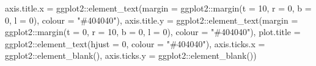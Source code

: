 \documentclass[
]{book}
\newenvironment{Shaded}{\begin{snugshade}}{\end{snugshade}}
\newcommand{\AttributeTok}[1]{\textcolor[rgb]{0.77,0.63,0.00}{#1}}
\newcommand{\DecValTok}[1]{\textcolor[rgb]{0.00,0.00,0.81}{#1}}
\newcommand{\FunctionTok}[1]{\textcolor[rgb]{0.00,0.00,0.00}{#1}}
\newcommand{\NormalTok}[1]{#1}
\newcommand{\SpecialCharTok}[1]{\textcolor[rgb]{0.00,0.00,0.00}{#1}}
\newcommand{\StringTok}[1]{\textcolor[rgb]{0.31,0.60,0.02}{#1}}
\begin{document}
\begin{Shaded}
\begin{Highlighting}[]
               \AttributeTok{axis.title.x =}\NormalTok{ ggplot2}\SpecialCharTok{::}\FunctionTok{element\_text}\NormalTok{(}\AttributeTok{margin =}\NormalTok{ ggplot2}\SpecialCharTok{::}\FunctionTok{margin}\NormalTok{(}\AttributeTok{t =} \DecValTok{10}\NormalTok{, }\AttributeTok{r =} \DecValTok{0}\NormalTok{, }\AttributeTok{b =} \DecValTok{0}\NormalTok{, }\AttributeTok{l =} \DecValTok{0}\NormalTok{), }\AttributeTok{colour =} \StringTok{"\#404040"}\NormalTok{),}
               \AttributeTok{axis.title.y =}\NormalTok{ ggplot2}\SpecialCharTok{::}\FunctionTok{element\_text}\NormalTok{(}\AttributeTok{margin =}\NormalTok{ ggplot2}\SpecialCharTok{::}\FunctionTok{margin}\NormalTok{(}\AttributeTok{t =} \DecValTok{0}\NormalTok{, }\AttributeTok{r =} \DecValTok{10}\NormalTok{, }\AttributeTok{b =} \DecValTok{0}\NormalTok{, }\AttributeTok{l =} \DecValTok{0}\NormalTok{), }\AttributeTok{colour =} \StringTok{"\#404040"}\NormalTok{),}
               \AttributeTok{plot.title =}\NormalTok{ ggplot2}\SpecialCharTok{::}\FunctionTok{element\_text}\NormalTok{(}\AttributeTok{hjust =} \DecValTok{0}\NormalTok{, }\AttributeTok{colour =} \StringTok{"\#404040"}\NormalTok{),}
               \AttributeTok{axis.ticks.x =}\NormalTok{ ggplot2}\SpecialCharTok{::}\FunctionTok{element\_blank}\NormalTok{(),}
               \AttributeTok{axis.ticks.y =}\NormalTok{ ggplot2}\SpecialCharTok{::}\FunctionTok{element\_blank}\NormalTok{())}


\end{Highlighting}
\end{Shaded}
\end{document}
